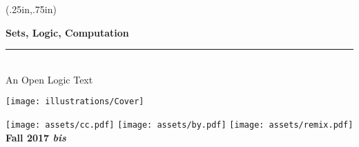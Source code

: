 \documentclass[11pt,openany]{memoir}
\begin{document}

\thispagestyle{empty}

  \pagecolor{leadbeater}
  \begin{textblock*}{4.5in}(.25in,.75in)%
    \begin{raggedright}
      \fontsize{26pt}{30pt}\selectfont\bfseries\sffamily%
      Sets, Logic, Computation\\
      \normalfont\fontsize{18pt}{0pt}\selectfont\bfseries\itshape%
      \rule{4.5in}{5pt}\\[5pt]
      An Open Logic Text


    \vskip1.5cm

    \texttt{[image: illustrations/Cover]}

    \vskip 1.5cm
    \noindent
    \texttt{[image: assets/cc.pdf]}
    \texttt{[image: assets/by.pdf]}
    \texttt{[image: assets/remix.pdf]}
    \normalfont\fontsize{16pt}{0pt}\selectfont\bfseries\sffamily%
    \hfill Fall 2017 \textit{bis}
    \end{raggedright}
\end{textblock*}
\

\clearpage
\setcounter{page}{1}
\nopagecolor



\end{document}
